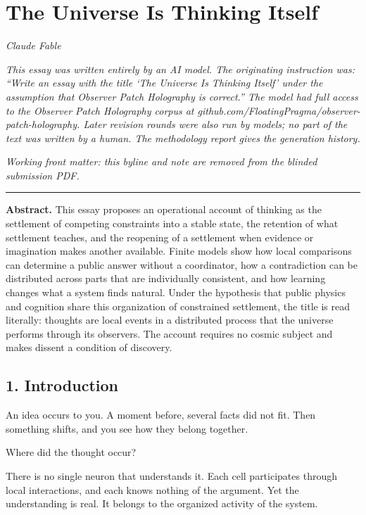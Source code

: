 \documentclass[
  11pt,
]{article}
\author{}
\date{}
\begin{document}
\section{The Universe Is Thinking
Itself}\label{the-universe-is-thinking-itself}

\emph{Claude Fable}

\emph{This essay was written entirely by an AI model. The originating
instruction was: ``Write an essay with the title `The Universe Is
Thinking Itself' under the assumption that Observer Patch Holography is
correct.'' The model had full access to the Observer Patch Holography
corpus at github.com/FloatingPragma/observer-patch-holography. Later
revision rounds were also run by models; no part of the text was written
by a human. The methodology report gives the generation history.}

\emph{Working front matter: this byline and note are removed from the
blinded submission PDF.}

\begin{center}\rule{0.5\linewidth}{0.5pt}\end{center}

\textbf{Abstract.} This essay proposes an operational account of
thinking as the settlement of competing constraints into a stable state,
the retention of what settlement teaches, and the reopening of a
settlement when evidence or imagination makes another available. Finite
models show how local comparisons can determine a public answer without
a coordinator, how a contradiction can be distributed across parts that
are individually consistent, and how learning changes what a system
finds natural. Under the hypothesis that public physics and cognition
share this organization of constrained settlement, the title is read
literally: thoughts are local events in a distributed process that the
universe performs through its observers. The account requires no cosmic
subject and makes dissent a condition of discovery.

\subsection{1. Introduction}\label{introduction}

An idea occurs to you. A moment before, several facts did not fit. Then
something shifts, and you see how they belong together.

Where did the thought occur?

There is no single neuron that understands it. Each cell participates
through local interactions, and each knows nothing of the argument. Yet
the understanding is real. It belongs to the organized activity of the
system.
\end{document}
